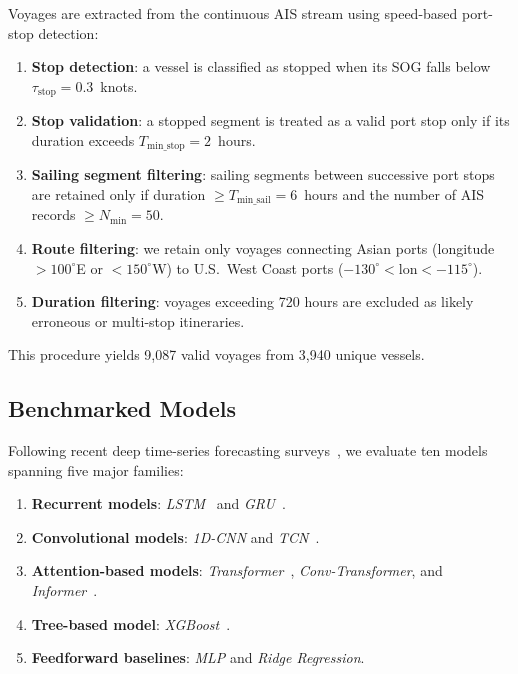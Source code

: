 \documentclass[sigconf,anonymous]{acmart}%
\begin{document}
Voyages are extracted from the continuous AIS stream using speed-based port-stop detection:
\begin{enumerate}
    \item \textbf{Stop detection}: a vessel is classified as stopped when its SOG falls below $\tau_{\text{stop}} = 0.3$~knots.
    \item \textbf{Stop validation}: a stopped segment is treated as a valid port stop only if its duration exceeds $T_{\text{min\_stop}} = 2$~hours.
    \item \textbf{Sailing segment filtering}: sailing segments between successive port stops are retained only if duration $\geq T_{\text{min\_sail}} = 6$~hours and the number of AIS records $\geq N_{\text{min}} = 50$.
    \item \textbf{Route filtering}: we retain only voyages connecting Asian ports (longitude $> 100^\circ$E or $< 150^\circ$W) to U.S.\ West Coast ports ($-130^\circ < \text{lon} < -115^\circ$).
    \item \textbf{Duration filtering}: voyages exceeding 720 hours are excluded as likely erroneous or multi-stop itineraries.
\end{enumerate}
This procedure yields 9,087 valid voyages from 3,940 unique vessels.

\subsection{Benchmarked Models}
\label{sec:model_selection}
Following recent deep time-series forecasting surveys~\cite{kim2025comprehensive, zeng2023transformers}, we evaluate ten models spanning five major families:
\begin{enumerate}
    \item \textbf{Recurrent models}: \textit{LSTM}~\cite{hochreiter1997lstm} and \textit{GRU}~\cite{cho2014gru}.
    \item \textbf{Convolutional models}: \textit{1D-CNN} and \textit{TCN}~\cite{bai2018tcn}.
    \item \textbf{Attention-based models}: \textit{Transformer}~\cite{vaswani2017attention}, \textit{Conv-Transformer}, and \textit{Informer}~\cite{zhou2021informer}.
    \item \textbf{Tree-based model}: \textit{XGBoost}~\cite{chen2016xgboost}.
    \item \textbf{Feedforward baselines}: \textit{MLP} and \textit{Ridge Regression}.
\end{enumerate}
\end{document}

